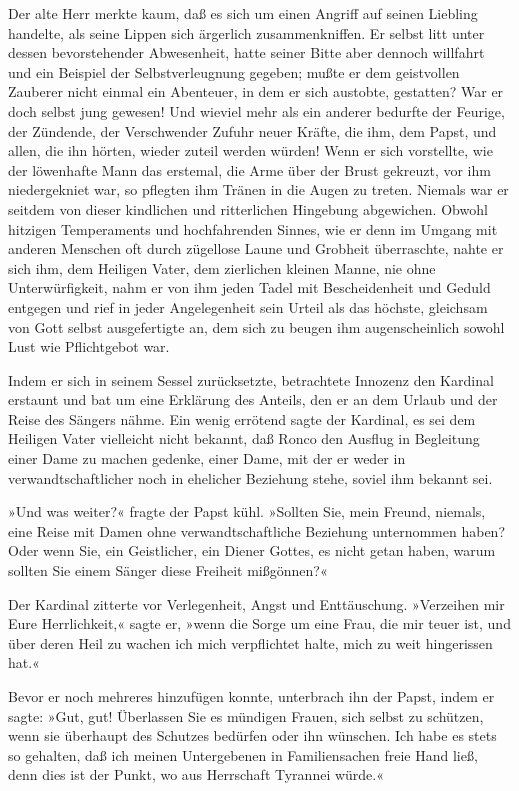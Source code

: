 Der alte Herr merkte kaum, daß es sich um einen Angriff auf seinen
Liebling handelte, als seine Lippen sich ärgerlich zusammenkniffen.
Er selbst litt unter dessen bevorstehender Abwesenheit, hatte
seiner Bitte aber dennoch willfahrt und ein Beispiel der
Selbstverleugnung gegeben; mußte er dem geistvollen Zauberer nicht
einmal ein Abenteuer, in dem er sich austobte, gestatten? War er
doch selbst jung gewesen! Und wieviel mehr als ein anderer bedurfte
der Feurige, der Zündende, der Verschwender Zufuhr neuer Kräfte,
die ihm, dem Papst, und allen, die ihn hörten, wieder zuteil werden
würden! Wenn er sich vorstellte, wie der löwenhafte Mann das
erstemal, die Arme über der Brust gekreuzt, vor ihm niedergekniet
war, so pflegten ihm Tränen in die Augen zu treten. Niemals war er
seitdem von dieser kindlichen und ritterlichen Hingebung
abgewichen. Obwohl hitzigen Temperaments und hochfahrenden Sinnes,
wie er denn im Umgang mit anderen Menschen oft durch zügellose
Laune und Grobheit überraschte, nahte er sich ihm, dem Heiligen
Vater, dem zierlichen kleinen Manne, nie ohne Unterwürfigkeit, nahm
er von ihm jeden Tadel mit Bescheidenheit und Geduld entgegen und
rief in jeder Angelegenheit sein Urteil als das höchste, gleichsam
von Gott selbst ausgefertigte an, dem sich zu beugen ihm
augenscheinlich sowohl Lust wie Pflichtgebot war.

Indem er sich in seinem Sessel zurücksetzte, betrachtete Innozenz
den Kardinal erstaunt und bat um eine Erklärung des Anteils, den er
an dem Urlaub und der Reise des\pagenum{[89]} Sängers nähme. Ein
wenig errötend sagte der Kardinal, es sei dem Heiligen Vater
vielleicht nicht bekannt, daß Ronco den Ausflug in Begleitung einer
Dame zu machen gedenke, einer Dame, mit der er weder in
verwandtschaftlicher noch in ehelicher Beziehung stehe, soviel ihm
bekannt sei.

»Und was weiter?« fragte der Papst kühl. »Sollten Sie, mein Freund,
niemals, eine Reise mit Damen ohne verwandtschaftliche Beziehung
unternommen haben? Oder wenn Sie, ein Geistlicher, ein Diener
Gottes, es nicht getan haben, warum sollten Sie einem Sänger diese
Freiheit mißgönnen?«

Der Kardinal zitterte vor Verlegenheit, Angst und Enttäuschung.
»Verzeihen mir Eure Herrlichkeit,« sagte er, »wenn die Sorge um
eine Frau, die mir teuer ist, und über deren Heil zu wachen ich
mich verpflichtet halte, mich zu weit hingerissen hat.«

Bevor er noch mehreres hinzufügen konnte, unterbrach ihn der Papst,
indem er sagte: »Gut, gut! Überlassen Sie es mündigen Frauen, sich
selbst zu schützen, wenn sie überhaupt des Schutzes bedürfen oder
ihn wünschen. Ich habe es stets so gehalten, daß ich meinen
Untergebenen in Familiensachen freie Hand ließ, denn dies ist der
Punkt, wo aus Herrschaft Tyrannei würde.«

